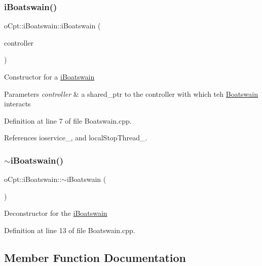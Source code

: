 \subsubsection{\texorpdfstring{i\+Boatswain()}{iBoatswain()}}
{\footnotesize\ttfamily o\+Cpt\+::i\+Boatswain\+::i\+Boatswain (\begin{DoxyParamCaption}\item[{\hyperlink{classo_cpt_1_1i_controller_a6d89a95cd6ad68bb74adfaca2f36370f}{i\+Controller\+::ptr}}]{controller }\end{DoxyParamCaption})}

Constructor for a \hyperlink{classo_cpt_1_1i_boatswain}{i\+Boatswain} 
\begin{DoxyParams}{Parameters}
{\em controller} & a shared\+\_\+ptr to the controller with which teh \hyperlink{classo_cpt_1_1_boatswain}{Boatswain} interacts \\
\hline
\end{DoxyParams}


Definition at line 7 of file Boatswain.\+cpp.



References ioservice\+\_\+, and local\+Stop\+Thread\+\_\+.

\hypertarget{classo_cpt_1_1i_boatswain_a0577a8228f2a93e07ef21e22e9c17bde}{}\label{classo_cpt_1_1i_boatswain_a0577a8228f2a93e07ef21e22e9c17bde} 
\subsubsection{\texorpdfstring{$\sim$i\+Boatswain()}{~iBoatswain()}}
{\footnotesize\ttfamily o\+Cpt\+::i\+Boatswain\+::$\sim$i\+Boatswain (\begin{DoxyParamCaption}{ }\end{DoxyParamCaption})\hspace{0.3cm}{\ttfamily [virtual]}}

Deconstructor for the \hyperlink{classo_cpt_1_1i_boatswain}{i\+Boatswain} 

Definition at line 13 of file Boatswain.\+cpp.



\subsection{Member Function Documentation}
\hypertarget{classo_cpt_1_1i_boatswain_aa064a9b107c71e71b25c5cbd4957e804}{}\label{classo_cpt_1_1i_boatswain_aa064a9b107c71e71b25c5cbd4957e804} 
